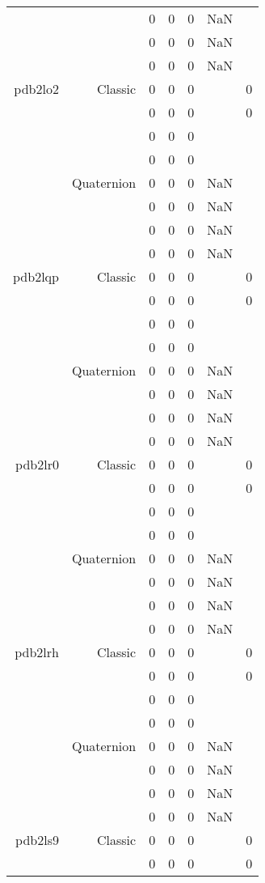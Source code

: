 \begin{xltabular}{\textwidth}{r|rcccSc}
& & 0 & 0 & 0 & NaN & \\
& & 0 & 0 & 0 & NaN & \\
& & 0 & 0 & 0 & NaN & \\ \addlinespace
pdb2lo2 & Classic & 0 & 0 & 0 & & 0 \\
& & 0 & 0 & 0 & & 0 \\
& & 0 & 0 & 0 & & \\
& & 0 & 0 & 0 & & \\
& Quaternion & 0 & 0 & 0 & NaN & \\
& & 0 & 0 & 0 & NaN & \\
& & 0 & 0 & 0 & NaN & \\
& & 0 & 0 & 0 & NaN & \\ \addlinespace
pdb2lqp & Classic & 0 & 0 & 0 & & 0 \\
& & 0 & 0 & 0 & & 0 \\
& & 0 & 0 & 0 & & \\
& & 0 & 0 & 0 & & \\
& Quaternion & 0 & 0 & 0 & NaN & \\
& & 0 & 0 & 0 & NaN & \\
& & 0 & 0 & 0 & NaN & \\
& & 0 & 0 & 0 & NaN & \\ \addlinespace
pdb2lr0 & Classic & 0 & 0 & 0 & & 0 \\
& & 0 & 0 & 0 & & 0 \\
& & 0 & 0 & 0 & & \\
& & 0 & 0 & 0 & & \\
& Quaternion & 0 & 0 & 0 & NaN & \\
& & 0 & 0 & 0 & NaN & \\
& & 0 & 0 & 0 & NaN & \\
& & 0 & 0 & 0 & NaN & \\ \addlinespace
pdb2lrh & Classic & 0 & 0 & 0 & & 0 \\
& & 0 & 0 & 0 & & 0 \\
& & 0 & 0 & 0 & & \\
& & 0 & 0 & 0 & & \\
& Quaternion & 0 & 0 & 0 & NaN & \\
& & 0 & 0 & 0 & NaN & \\
& & 0 & 0 & 0 & NaN & \\
& & 0 & 0 & 0 & NaN & \\ \addlinespace
pdb2ls9 & Classic & 0 & 0 & 0 & & 0 \\
& & 0 & 0 & 0 & & 0 \\

\end{xltabular}
